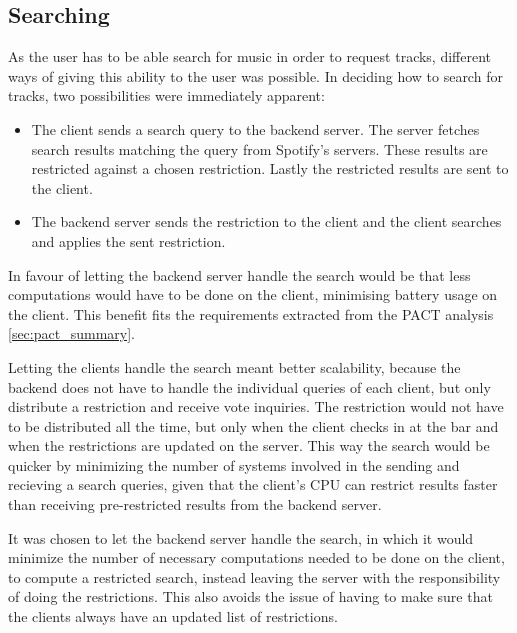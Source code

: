 \subsection{Searching}
As the user has to be able search for music in order to request tracks, different ways of giving this ability to the user was possible. In deciding how to search for tracks, two possibilities were immediately apparent:

\begin{itemize}
  \item The client sends a search query to the backend server. The
    server fetches search results matching the query from Spotify's servers. These results are restricted against a chosen restriction. Lastly the restricted results are sent to the client.
  \item The backend server sends the restriction to the client and the client searches and applies the sent restriction.
\end{itemize}

In favour of letting the backend server handle the search would be
that less computations would have to be done on the client, minimising
battery usage on the client. This benefit fits the requirements extracted from the PACT analysis \cref{sec:pact_summary}.

Letting the clients handle the search meant better scalability,
because the backend does not have to handle the individual queries of
each client, but only distribute a restriction and receive vote
inquiries. The restriction would not have to be distributed all the
time, but only  when the client checks in at the bar and when the
restrictions are updated on the server. This way the search would be
quicker by minimizing the number of systems involved in the sending and recieving a search queries, given that
the client's CPU can restrict results faster than receiving pre-restricted results from the backend server.

It was chosen to let the backend server handle the search, in which it would minimize the number of necessary computations needed to be done on the client, to compute a restricted search, instead leaving the server with the responsibility of doing the restrictions. This also avoids the issue of having to make sure that the clients always have an updated list of restrictions.
